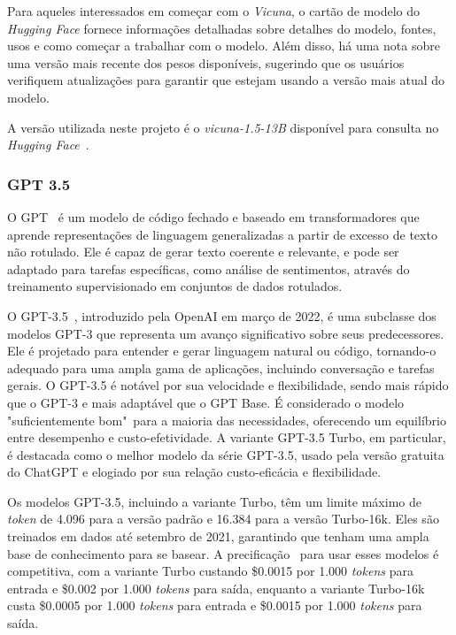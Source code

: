 Para aqueles interessados em começar com o \textit{Vicuna}, o cartão de modelo do \textit{Hugging Face} fornece informações detalhadas sobre detalhes do modelo, fontes, usos e como começar a trabalhar com o modelo. Além disso, há uma nota sobre uma versão mais recente dos pesos disponíveis, sugerindo que os usuários verifiquem atualizações para garantir que estejam usando a versão mais atual do modelo.

A versão utilizada neste projeto é o \textit{vicuna-1.5-13B} disponível para consulta no \textit{Hugging Face}~\cite{vicuna1513b}.

\subsubsection{GPT 3.5}
\label{cap:fund_teorica:sec:modelos:subsec:gpt}

O GPT~\cite{enwiki:1226113577} é um modelo de código fechado e baseado em transformadores que aprende representações de linguagem generalizadas a partir de excesso de texto não rotulado. Ele é capaz de gerar texto coerente e relevante, e pode ser adaptado para tarefas específicas, como análise de sentimentos, através do treinamento supervisionado em conjuntos de dados rotulados.

O GPT-3.5~\cite{openai:gpt35turbo}, introduzido pela OpenAI em março de 2022, é uma subclasse dos modelos GPT-3 que representa um avanço significativo sobre seus predecessores. Ele é projetado para entender e gerar linguagem natural ou código, tornando-o adequado para uma ampla gama de aplicações, incluindo conversação e tarefas gerais. O GPT-3.5 é notável por sua velocidade e flexibilidade, sendo mais rápido que o GPT-3 e mais adaptável que o GPT Base. É considerado o modelo "suficientemente bom"\ para a maioria das necessidades, oferecendo um equilíbrio entre desempenho e custo-efetividade. A variante GPT-3.5 Turbo, em particular, é destacada como o melhor modelo da série GPT-3.5, usado pela versão gratuita do ChatGPT e elogiado por sua relação custo-eficácia e flexibilidade.

Os modelos GPT-3.5, incluindo a variante Turbo, têm um limite máximo de \textit{token} de 4.096 para a versão padrão e 16.384 para a versão Turbo-16k. Eles são treinados em dados até setembro de 2021, garantindo que tenham uma ampla base de conhecimento para se basear. A precificação~\cite{openai:gptpricing} para usar esses modelos é competitiva, com a variante Turbo custando \$0.0015 por 1.000 \textit{tokens} para entrada e \$0.002 por 1.000 \textit{tokens} para saída, enquanto a variante Turbo-16k custa \$0.0005 por 1.000 \textit{tokens} para entrada e \$0.0015 por 1.000 \textit{tokens} para saída.

